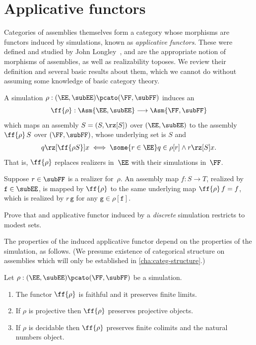 \section{Applicative functors}
\label{sec:applicative-functors}


%
%

Categories of assemblies themselves form a category whose morphisms are functors induced by simulations, known as \emph{applicative functors}. These were defined and studied by John Longley~\cite{Longley:95}, and are the appropriate notion of morphisms of assemblies, as well as realizability toposes. We review their definition and several basic results about them, which we cannot do without assuming some knowledge of basic category theory.

A simulation $\rho: (\EE, \subEE) \pcato (\FF, \subFF)$ induces an 
%
\begin{equation*}
  \ff{\rho}: \Asm{\EE, \subEE} \longrightarrow \Asm{\FF, \subFF}
\end{equation*}
%
which maps an assembly $S = (S, {\rz[S]})$ over $(\EE, \subEE)$ to the assembly
$\ff{\rho} \, S$ over $(\FF, \subFF)$, whose underlying set is $S$ and
%
\begin{align*}
  q \rz[\ff{\rho S}] x
  \iff \some{r \in \EE} q \in \rho[r] \land r \rz[S] x.
\end{align*}
%
That is, $\ff{\rho}$ replaces realizers in~$\EE$ with their simulations in~$\FF$.

Suppose $r \in \subFF$ is a realizer for~$\rho$. An assembly map $f: S \to T$, realized by $\mathtt{f} \in \subEE$, is mapped by $\ff{\rho}$ to the same underlying map $\ff{\rho}\,f = f$, which is realized by $r \, \mathtt{g}$ for any $\mathtt{g} \in \rho[\mathtt{f}]$.

\begin{exercise}
  Prove that and applicative functor induced by a \emph{discrete} simulation restricts to modest sets.
\end{exercise}

The properties of the induced applicative functor depend on the properties of the simulation, as follows. (We presume existence of categorical structure on assemblies which will only be established in \cref{cha:categ-structure}.)

\begin{proposition}
  \label{th:applicative_functor_properties}%
  Let $\rho: (\EE, \subEE) \pcato (\FF, \subFF)$ be a simulation.
  \begin{enumerate}
  \item
    The functor $\ff{\rho}$ is faithful  and it preserves finite limits.
  \item
    If $\rho$ is projective then $\ff{\rho}$ preserves projective objects.
  \item
    If $\rho$ is decidable then $\ff{\rho}$ preserves finite colimits and the natural numbers object.
  \end{enumerate}
\end{proposition}

